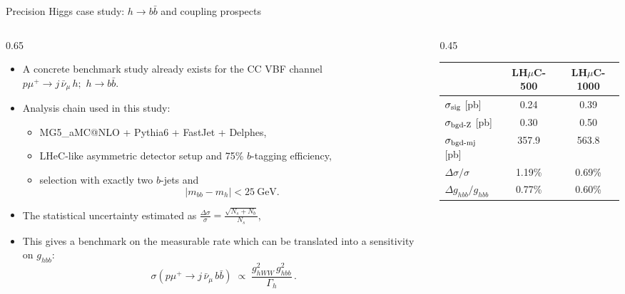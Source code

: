 \documentclass[aspectratio=1610,english]{beamer}
\begin{document}
\begin{frame}{Precision Higgs case study: $h\to b\bar b$ and coupling prospects}
	
\begin{columns}[T]

\begin{column}{0.65\textwidth}
\begin{itemize}
\justifying
\small
				
\item A concrete benchmark study already exists for the CC VBF channel~~ {\color{magenta}$
p\mu^{+}\to j\,\bar{\nu}_{\mu}\,h; \,\, h\to b\bar b$}.
				
\item Analysis chain used in this study:
\begin{itemize}
\justifying
\small
\item MG5\_aMC@NLO + Pythia6 + FastJet + Delphes,
\item LHeC-like asymmetric detector setup and 75\% $b$-tagging efficiency,
\item selection with exactly two $b$-jets and
\[
|m_{bb}-m_h|<25~\mathrm{GeV}.
\]
\end{itemize}
				
\item The statistical uncertainty estimated as $\frac{\Delta\sigma}{\sigma}
= \frac{\sqrt{N_s+N_b}}{N_s}$,

\item This gives a benchmark on the measurable rate which can be translated into a sensitivity on $g_{hbb}$:
\[ \sigma(p\mu^{+}\to j\,\bar{\nu}_{\mu}\,b\bar b) \;\propto\; \frac{g_{hWW}^2\,g_{hbb}^2}{\Gamma_h}\,. \]
				
\end{itemize}
\end{column}
		
		
		
\begin{column}{0.45\textwidth}
\centering
\scriptsize
\renewcommand{\arraystretch}{1.15}
\setlength{\tabcolsep}{4pt}
\begin{tabular}{lcc}
\toprule
& LH$\mu$C-500 & LH$\mu$C-1000 \\
\midrule
$\sigma_{\rm sig}$ [pb]      & 0.24 & 0.39 \\
$\sigma_{\rm bgd\text{-}Z}$ [pb] & 0.30 & 0.50 \\
$\sigma_{\rm bgd\text{-}mj}$ [pb] & 357.9 & 563.8 \\
\midrule
$\Delta \sigma/\sigma$ & 1.19\% & 0.69\% \\
$\Delta g_{hbb}/g_{hbb}$ & 0.77\% & 0.60\% \\
\bottomrule
\end{tabular}


\end{column}
\end{columns}
\end{frame}
\end{document}

